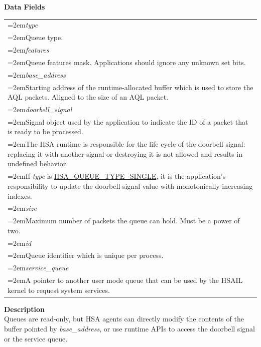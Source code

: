 \documentclass[final]{book}
\newcommand{\reffld}[1]{\textit{#1}}
\begin{document}
\noindent\textbf{Data Fields}\\[-6mm]
\begin{longtable}{@{}>{\hangindent=2em}p{\textwidth}}
\reffld{type}\\\hspace{2em}Queue type.\\[2mm]
\reffld{features}\\\hspace{2em}Queue features mask. Applications should ignore any unknown set bits.\\[2mm]
\reffld{base_address}\\\hspace{2em}Starting address of the runtime-allocated buffer which is used to store the AQL packets. Aligned to the size of an AQL packet.\\[2mm]
\reffld{doorbell_signal}\\\hspace{2em}Signal object used by the application to indicate the ID of a packet that is ready to be processed.\\[2mm]
\hspace{2em}The HSA runtime is responsible for the life cycle of the doorbell signal: replacing it with another signal or destroying it is not allowed and results in undefined behavior.\\[2mm]
\hspace{2em}If \textit{type} is \hyperlink{group__queue_1ggaf1939f228a41fa6ee50cffd4de03b561a45c3277e4e4fcb8a9788081549551f0a}{HSA_QUEUE_TYPE_SINGLE}, it is the application's responsibility to update the doorbell signal value with monotonically increasing indexes.\\[2mm]
\reffld{size}\\\hspace{2em}Maximum number of packets the queue can hold. Must be a power of two.\\[2mm]
\reffld{id}\\\hspace{2em}Queue identifier which is unique per process.\\[2mm]
\reffld{service_queue}\\\hspace{2em}A pointer to another user mode queue that can be used by the HSAIL kernel to request system services.
\end{longtable}

\vspace{-4mm}\noindent\textbf{Description}\\[1mm]
Queues are read-only, but HSA agents can directly modify the contents of the buffer pointed by \textit{base_address}, or use runtime APIs to access the doorbell signal or the service queue. 
\end{document}
